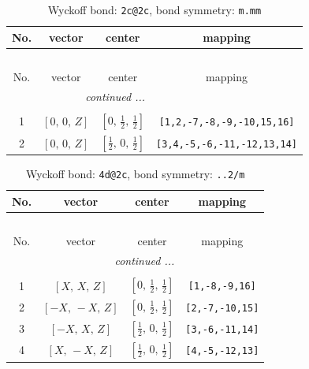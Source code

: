 \documentclass[fleqn,8pt]{jsarticle}
\begin{document}
\begin{longtable}{cccc}
\caption{Wyckoff bond: {\tt 2c@2c}, bond symmetry: {\tt m.mm}}
 \\
 \hline \hline
No. & vector & center & mapping \\ \hline \endfirsthead

\multicolumn{3}{l}{\tablename\ \thetable{}} \\
 \hline \hline
No. & vector & center & mapping \\ \hline \endhead

 \hline \hline
\multicolumn{3}{r}{\footnotesize\it continued ...} \\ \endfoot

 \hline \hline
\multicolumn{3}{r}{} \\ \endlastfoot

1 & $\left[ 0,\, 0,\, Z \right]$ & $\left[ 0,\, \frac{1}{2},\, \frac{1}{2} \right]$ & {\tt [1,2,-7,-8,-9,-10,15,16]} \\ \hline
2 & $\left[ 0,\, 0,\, Z \right]$ & $\left[ \frac{1}{2},\, 0,\, \frac{1}{2} \right]$ & {\tt [3,4,-5,-6,-11,-12,13,14]} \\
\end{longtable}
\renewcommand{\arraystretch}{1.2}
\begin{longtable}{cccc}
\caption{Wyckoff bond: {\tt 4d@2c}, bond symmetry: {\tt ..2/m}}
 \\
 \hline \hline
No. & vector & center & mapping \\ \hline \endfirsthead

\multicolumn{3}{l}{\tablename\ \thetable{}} \\
 \hline \hline
No. & vector & center & mapping \\ \hline \endhead

 \hline \hline
\multicolumn{3}{r}{\footnotesize\it continued ...} \\ \endfoot

 \hline \hline
\multicolumn{3}{r}{} \\ \endlastfoot

1 & $\left[ X,\, X,\, Z \right]$ & $\left[ 0,\, \frac{1}{2},\, \frac{1}{2} \right]$ & {\tt [1,-8,-9,16]} \\ \hline
2 & $\left[ - X,\, - X,\, Z \right]$ & $\left[ 0,\, \frac{1}{2},\, \frac{1}{2} \right]$ & {\tt [2,-7,-10,15]} \\ \hline
3 & $\left[ - X,\, X,\, Z \right]$ & $\left[ \frac{1}{2},\, 0,\, \frac{1}{2} \right]$ & {\tt [3,-6,-11,14]} \\ \hline
4 & $\left[ X,\, - X,\, Z \right]$ & $\left[ \frac{1}{2},\, 0,\, \frac{1}{2} \right]$ & {\tt [4,-5,-12,13]} \\
\end{longtable}
\end{document}
